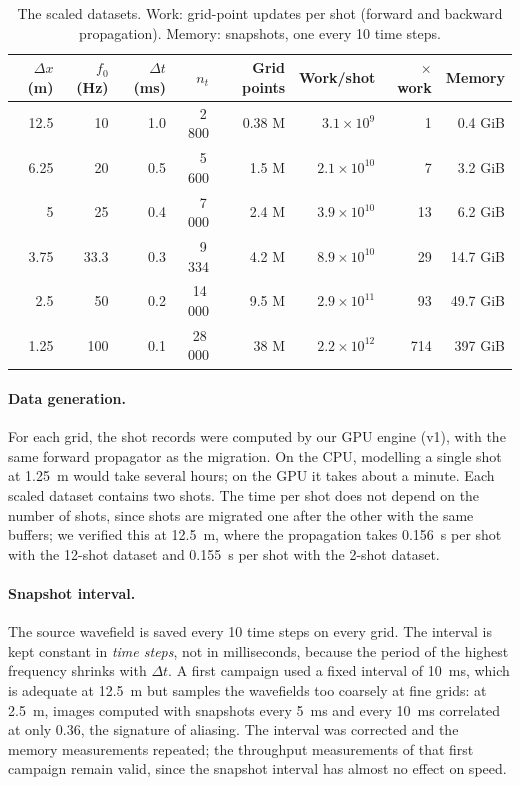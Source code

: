 \documentclass[letterpaper,11pt,leqno]{article}
\begin{document}
\begin{table}[H]
\centering
\caption{The scaled datasets. Work: grid-point updates per shot (forward and
backward propagation). Memory: snapshots, one every 10 time steps.}
\label{tab:workload}
\begin{tabular}{rrrrrrrr}
\toprule
$\Delta x$ (m) & $f_0$ (Hz) & $\Delta t$ (ms) & $n_t$ & Grid points & Work/shot & $\times$ work & Memory \\
\midrule
12.5 & 10   & 1.0 & 2\,800  & 0.38 M & $3.1\times10^{9}$  & 1   & 0.4 GiB \\
6.25 & 20   & 0.5 & 5\,600  & 1.5 M  & $2.1\times10^{10}$ & 7   & 3.2 GiB \\
5    & 25   & 0.4 & 7\,000  & 2.4 M  & $3.9\times10^{10}$ & 13  & 6.2 GiB \\
3.75 & 33.3 & 0.3 & 9\,334  & 4.2 M  & $8.9\times10^{10}$ & 29  & 14.7 GiB \\
2.5  & 50   & 0.2 & 14\,000 & 9.5 M  & $2.9\times10^{11}$ & 93  & 49.7 GiB \\
1.25 & 100  & 0.1 & 28\,000 & 38 M   & $2.2\times10^{12}$ & 714 & 397 GiB \\
\bottomrule
\end{tabular}
\end{table}

\paragraph{Data generation.}
For each grid, the shot records were computed by our GPU engine (v1), with the
same forward propagator as the migration. On the CPU, modelling a single shot at
1.25~m would take several hours; on the GPU it takes about a minute. Each scaled
dataset contains two shots. The time per shot does not depend on the number of
shots, since shots are migrated one after the other with the same buffers; we
verified this at 12.5~m, where the propagation takes 0.156~s per shot with
the 12-shot dataset and 0.155~s per shot with the 2-shot dataset.

\paragraph{Snapshot interval.}
The source wavefield is saved every 10 time steps on every grid. The interval
is kept constant in \emph{time steps}, not in milliseconds, because the period
of the highest frequency shrinks with $\Delta t$. A first campaign used a fixed
interval of 10~ms, which is adequate at 12.5~m but samples the wavefields too
coarsely at fine grids: at 2.5~m, images computed with snapshots every 5~ms and
every 10~ms correlated at only $0.36$, the signature of aliasing. The interval
was corrected and the memory measurements repeated; the throughput
measurements of that first campaign remain valid, since the snapshot interval
has almost no effect on speed.
\end{document}
